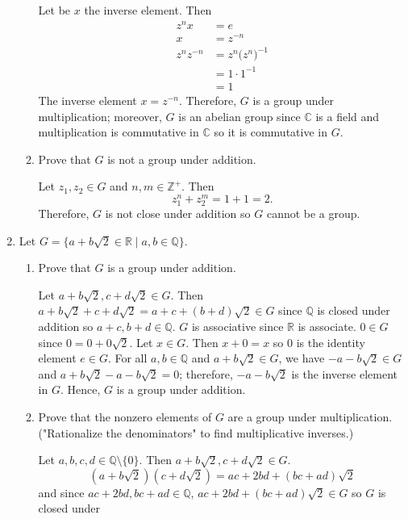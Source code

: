 \begin{enumerate}
\begin{enumerate}[label = (\alph*)]
    Let be \(x\) the inverse element.
    Then 
    \begin{align*}
      z^nx & = e\\
      x & = z^{-n}\\
      z^nz^{-n} &= z^n\bigl(z^n\bigr)^{-1}\\
           & = 1\cdot 1^{-1}\\
           & = 1
    \end{align*}
    The inverse element \(x = z^{-n}\).
    Therefore, \(G\) is a group under multiplication; moreover, \(G\) is an
    abelian group since \(\mathbb{C}\) is a field and multiplication is
    commutative in \(\mathbb{C}\) so it is commutative in \(G\).
  \item
    Prove that \(G\) is not a group under addition.
    \par\smallskip
    Let \(z_1, z_2\in G\) and \(n, m\in\mathbb{Z}^+\).
    Then
    \[
    z_1^n + z_2^m = 1 + 1 = 2.
    \]
    Therefore, \(G\) is not close under addition so \(G\) cannot be a group.
  \end{enumerate}
\item
  Let \(G = \{a + b\sqrt{2}\in\mathbb{R}\mid a, b\in\mathbb{Q}\}\).
  \begin{enumerate}[label = (\alph*)]
  \item
    Prove that \(G\) is a group under addition.
    \par\smallskip
    Let \(a + b\sqrt{2}, c + d\sqrt{2}\in G\).
    Then \(a + b\sqrt{2} + c + d\sqrt{2} = a + c + (b + d)\sqrt{2}\in G\) since
    \(\mathbb{Q}\) is closed under addition so \(a + c, b + d\in\mathbb{Q}\).
    \(G\) is associative since \(\mathbb{R}\) is associate.
    \(0\in G\) since \(0 = 0 + 0\sqrt{2}\).
    Let \(x\in G\).
    Then \(x + 0 = x\) so \(0\) is the identity element \(e\in G\).
    For all \(a, b\in\mathbb{Q}\) and \(a + b\sqrt{2}\in G\), we have
    \(-a - b\sqrt{2}\in G\) and \(a + b\sqrt{2} - a - b\sqrt{2} = 0\);
    therefore, \(-a - b\sqrt{2}\) is the inverse element in \(G\).
    Hence, \(G\) is a group under addition.
  \item
    Prove that the nonzero elements of \(G\) are a group under multiplication.
    ("Rationalize the denominators" to find multiplicative inverses.)
    \par\smallskip
    Let \(a,b,c,d\in\mathbb{Q}\setminus\{0\}\).
    Then \(a + b\sqrt{2}, c + d\sqrt{2}\in G\).
    \[
    (a + b\sqrt{2})(c + d\sqrt{2}) = ac + 2bd + (bc + ad)\sqrt{2}
    \]
    and since \(ac + 2bd, bc + ad\in\mathbb{Q}\),
    \(ac + 2bd + (bc + ad)\sqrt{2}\in G\) so \(G\) is closed under

\end{enumerate}
\end{enumerate}

